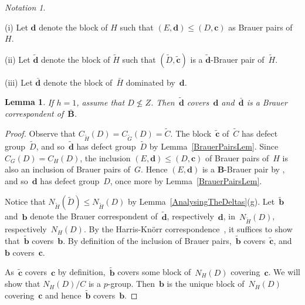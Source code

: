\documentclass[12pt]{amsart}
\newcommand{\bB}{{\mathbf{B}}}
\newcommand{\bb}{{\mathbf{b}}}
\newcommand{\bc}{{\mathbf{c}}}
\newcommand{\bd}{{\mathbf{d}}}
\newtheorem{lem}[thm]{Lemma}
\theoremstyle{theorem}
\theoremstyle{definition}
\theoremstyle{remark}
\newtheorem{notn}[thm]{Notation}
\begin{document}
\addtocounter{thm}{1}
\begin{notn} 
\label{HypoVI}
{\rm 
(i) Let $\bd$ denote the block of $H$ such that 
$( E, \bd ) \leq ( D, \bc )$ as Brauer pairs of~$H$.

(ii) Let $\tilde{\bd}$ denote the block of $\tilde{H}$ such that 
$( \tilde{D}, \tilde{\bc} )$ is a $\tilde{\bd}$-Brauer pair of~$\tilde{H}$.

(iii) Let $\bar{\bd}$ denote the block of~$\bar{H}$ dominated by~$\bd$.
}
\end{notn}

\begin{lem}
\label{IntermediateBlocksLem}
If $h = 1$, assume that $D \not\leq Z$. Then~$\tilde{\bd}$ covers~$\bd$ 
and~$\bar{\bd}$ is a Brauer correspondent of~$\bar{\bB}$.
\end{lem}
\begin{proof}
Observe that $C_{\tilde{H}}( D ) = C_{\tilde{G}}( D ) = \tilde{C}$. The 
block~$\tilde{\bc}$ of~$\tilde{C}$ has defect group~$\tilde{D}$, and 
so~$\tilde{\bd}$ has defect group~$\tilde{D}$ by Lemma~\ref{BrauerPairsLem}. 
Since $C_G( D ) = C_{H}( D )$, 
the inclusion $( E, \bd ) \leq ( D, \bc )$ of Brauer pairs of~$H$ is also an
inclusion of Brauer pairs of~$G$. Hence $( E, \bd )$ is a $\bB$-Brauer pair by 
\cite[Proposition~$6.3.6$]{LinckBook}, and so~$\bd$ has defect group~$D$, once
more by Lemma~\ref{BrauerPairsLem}.

Notice that $N_{\tilde{H}}( \tilde{ D } ) \leq N_{\tilde{H}}( D )$ by 
Lemma~\ref{AnalysingTheDeltas}(g). Let~$\tilde{\bb}$ and~$\bb$ denote the 
Brauer correspondent of~$\tilde{\bd}$, respectively~$\bd$, 
in~$N_{\tilde{H}}( D )$, respectively~$N_{H}( D )$.
By 
the Harris-Kn{\"o}rr correspondence~\cite[Theorem]{HK85}, it suffices to show 
that~$\tilde{\bb}$ covers~$\bb$. By definition of the inclusion of Brauer
pairs,~$\tilde{\bb}$ covers~$\tilde{\bc}$, and~$\bb$ covers~$\bc$.

As~$\tilde{\bc}$ covers~$\bc$ by definition,~$\tilde{\bb}$ covers some block
of~$N_{H}( D )$ covering~$\bc$. We will show that $N_H( D )/C$ is a $p$-group.
Then~$\bb$ is the unique block of~$N_{H}( D )$ covering~$\bc$ and 
hence~$\tilde{\bb}$ covers~$\bb$.


\end{proof}
\end{document}
